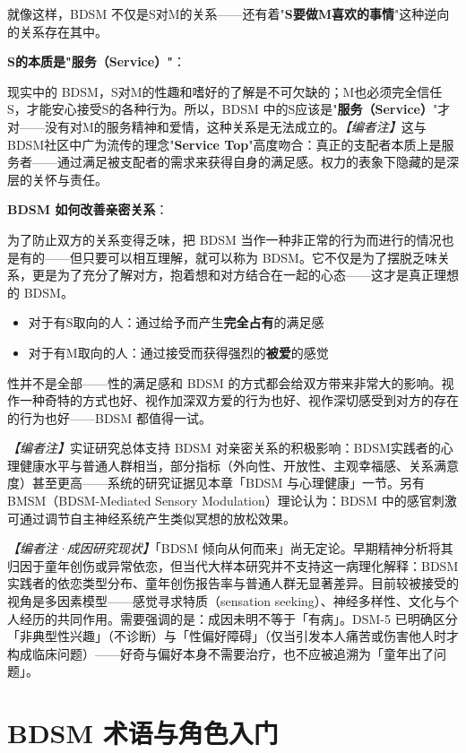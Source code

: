 \documentclass[12pt,UTF8]{ctexbook}
\begin{document}
就像这样，BDSM 不仅是S对M的关系——还有着"\textbf{S要做M喜欢的事情}"这种逆向的关系存在其中。

\noindent\textbf{S的本质是"服务（Service）"}：

现实中的 BDSM，S对M的性趣和嗜好的了解是不可欠缺的；M也必须完全信任S，才能安心接受S的各种行为。所以，BDSM 中的S应该是"\textbf{服务（Service）}"才对——没有对M的服务精神和爱情，这种关系是无法成立的。\textit{【编者注】}这与BDSM社区中广为流传的理念"\textbf{Service Top}"高度吻合：真正的支配者本质上是服务者——通过满足被支配者的需求来获得自身的满足感。权力的表象下隐藏的是深层的关怀与责任。

\noindent\textbf{BDSM 如何改善亲密关系}：

为了防止双方的关系变得乏味，把 BDSM 当作一种非正常的行为而进行的情况也是有的——但只要可以相互理解，就可以称为 BDSM。它不仅是为了摆脱乏味关系，更是为了充分了解对方，抱着想和对方结合在一起的心态——这才是真正理想的 BDSM。

\begin{itemize}
	\item 对于有S取向的人：通过给予而产生\textbf{完全占有}的满足感
	\item 对于有M取向的人：通过接受而获得强烈的\textbf{被爱}的感觉
\end{itemize}

性并不是全部——性的满足感和 BDSM 的方式都会给双方带来非常大的影响。视作一种奇特的方式也好、视作加深双方爱的行为也好、视作深切感受到对方的存在的行为也好——BDSM 都值得一试。

\textit{【编者注】}实证研究总体支持 BDSM 对亲密关系的积极影响：BDSM实践者的心理健康水平与普通人群相当，部分指标（外向性、开放性、主观幸福感、关系满意度）甚至更高——系统的研究证据见本章「BDSM 与心理健康」一节。另有BMSM（BDSM-Mediated Sensory Modulation）理论认为：BDSM 中的感官刺激可通过调节自主神经系统产生类似冥想的放松效果。

\noindent\textit{【编者注·成因研究现状】}「BDSM 倾向从何而来」尚无定论。早期精神分析将其归因于童年创伤或异常依恋，但当代大样本研究并不支持这一病理化解释：BDSM 实践者的依恋类型分布、童年创伤报告率与普通人群无显著差异。目前较被接受的视角是多因素模型——感觉寻求特质（sensation seeking）、神经多样性、文化与个人经历的共同作用。需要强调的是：成因未明不等于「有病」。DSM-5 已明确区分「非典型性兴趣」（不诊断）与「性偏好障碍」（仅当引发本人痛苦或伤害他人时才构成临床问题）——好奇与偏好本身不需要治疗，也不应被追溯为「童年出了问题」。

\section{BDSM 术语与角色入门}
\end{document}
